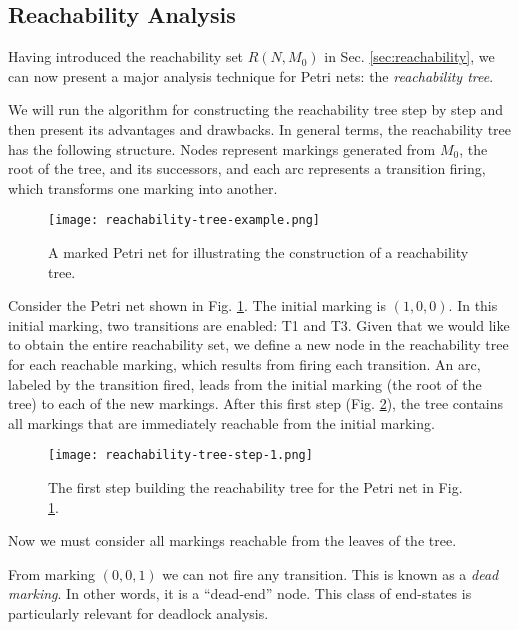 \documentclass[../Thesis.tex]{subfiles}
\begin{document}
\subsection{Reachability Analysis}

Having introduced the reachability set $R(N, M_0)$ in Sec. \ref{sec:reachability},
we can now present a major analysis technique for Petri nets: the \emph{reachability tree}.

We will run the algorithm for constructing the reachability tree step by step
and then present its advantages and drawbacks.
In general terms, the reachability tree has the following structure.
Nodes represent markings generated from $M_0$, the root of the tree, and its successors,
and each arc represents a transition firing, which transforms one marking into another.

\begin{figure}
    \centering
    \texttt{[image: reachability-tree-example.png]}
    \caption{A marked Petri net for illustrating the construction of a reachability tree.}
    \label{fig:reachability-tree-example}
\end{figure}

Consider the Petri net shown in Fig. \ref{fig:reachability-tree-example}.
The initial marking is $(1, 0, 0)$.
In this initial marking, two transitions are enabled: T1 and T3.
Given that we would like to obtain the entire reachability set,
we define a new node in the reachability tree for each reachable marking,
which results from firing each transition.
An arc, labeled by the transition fired, leads from the initial marking
(the root of the tree) to each of the new markings.
After this first step (Fig. \ref{fig:reachability-tree-step-1}), the tree contains all markings
that are immediately reachable from the initial marking.

\begin{figure}
    \centering
    \texttt{[image: reachability-tree-step-1.png]}
    \caption{The first step building the reachability tree
        for the Petri net in Fig. \ref{fig:reachability-tree-example}.}
    \label{fig:reachability-tree-step-1}
\end{figure}

Now we must consider all markings reachable from the leaves of the tree.

From marking $(0,0,1)$ we can not fire any transition.
This is known as a \emph{dead marking}.
In other words, it is a ``dead-end'' node.
This class of end-states is particularly relevant for deadlock analysis.
\end{document}
